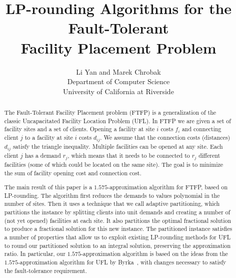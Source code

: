 \documentclass[11pt]{article}
\title{LP-rounding Algorithms for the Fault-Tolerant\\
 		Facility Placement Problem}
\author{Li Yan and Marek Chrobak\\
  Department of Computer Science\\
 University of California at Riverside}
\date{}
\begin{document}
\maketitle

\thispagestyle{empty}
\begin{abstract} 
  The Fault-Tolerant Facility Placement problem (FTFP) is a
  generalization of the classic Uncapacitated Facility
  Location Problem (UFL). In FTFP we are given a set of
  facility sites and a set of clients. Opening a facility at
  site $i$ costs $f_i$ and connecting client $j$ to a
  facility at site $i$ costs $d_{ij}$. We assume that the
  connection costs (distances) $d_{ij}$ satisfy the triangle
  inequality. Multiple facilities can be opened at any
  site. Each client $j$ has a demand $r_j$, which means that
  it needs to be connected to $r_j$ different facilities
  (some of which could be located on the same site). The
  goal is to minimize the sum of facility opening cost and
  connection cost.

  The main result of this paper is a $1.575$-approximation
  algorithm for FTFP, based on LP-rounding. The algorithm
  first reduces the demands to values polynomial in the
  number of sites. Then it uses a technique that we
  call adaptive partitioning, which partitions the instance
  by splitting clients into unit demands and creating a
  number of (not yet opened) facilities at each site. It
  also partitions the optimal fractional solution to produce
  a fractional solution for this new instance.  The
  partitioned instance satisfies a number of properties that
  allow us to exploit existing LP-rounding methods for UFL to
  round our partitioned solution to an integral
  solution, preserving the approximation ratio.  In
  particular, our $1.575$-approximation algorithm is based
  on the ideas from the $1.575$-approximation algorithm for
  UFL by Byrka~\etal, with changes necessary to satisfy
  the fault-tolerance requirement.
\end{abstract}

\pagebreak
\setcounter{page}{1}




\end{document}
